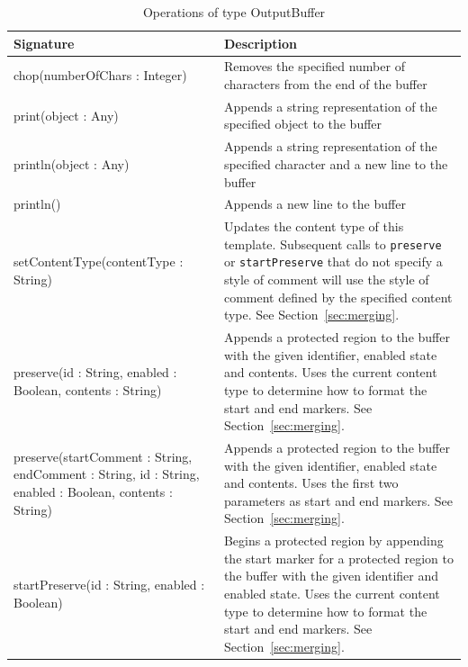 \begin{longtabu} {|p{6.5cm}|X|}
			
			\caption{Operations of type OutputBuffer}
			\label{tab:OutputBufferOperations}\\
			
			\hline
							
			\textbf{Signature} & \textbf{Description} \\\hline
			
			chop(numberOfChars : Integer) & Removes the specified number of characters from the end of the buffer \\\hline
			
			print(object : Any) & Appends a string representation of the specified object to the buffer \\\hline
			
			println(object : Any) & Appends a string representation of the specified character and a new line to the buffer \\\hline
			
			println() & Appends a new line to the buffer \\\hline
			
			setContentType(contentType : String) & Updates the content type of this template. Subsequent calls to \texttt{pr\-es\-er\-ve} or \texttt{st\-a\-rtPr\-es\-er\-ve} that do not specify a style of comment will use the style of comment defined by the specified content type. See Section~\ref{sec:merging}. \\\hline
			
			preserve(id : String, enabled : Boolean, contents : String) & Appends a protected region to the buffer with the given identifier, enabled state and contents. Uses the current content type to determine how to format the start and end markers. See Section~\ref{sec:merging}. \\\hline
			
			preserve(startComment : String, endComment : String, id : String, enabled : Boolean, contents : String) & Appends a protected region to the buffer with the given identifier, enabled state and contents. Uses the first two parameters as start and end markers. See Section~\ref{sec:merging}. \\\hline
			
			startPreserve(id : String, enabled : Boolean) & Begins a protected region by appending the start marker for a protected region to the buffer with the given identifier and enabled state. Uses the current content type to determine how to format the start and end markers. See Section~\ref{sec:merging}. \\\hline
			

\end{longtabu}
